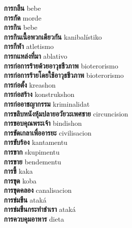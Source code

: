\textbf{ การกลืน  } bebe \\
\textbf{ การกัด  } morde \\
\textbf{ การกิน  } bebe \\
\textbf{ การกินเนื้อพวกเดียวกัน  } kanibalístiko \\
\textbf{ การกีฬา  } atletismo \\
\textbf{ การกแหล่งที่มา  } ablativo \\
\textbf{ การก่อการร้ายด้วยอาวุธชีวภาพ  } bioterorismo \\
\textbf{ การก่อการร้ายโดยใช้อาวุธชีวภาพ  } bioterorismo \\
\textbf{ การก่อตั้ง  } kreashon \\
\textbf{ การก่อสร้าง  } konstrukshon \\
\textbf{ การก่ออาชญากรรม  } kriminalidat \\
\textbf{ การขลิบหนังหุ้มปลายอวัยวะเพศชาย  } circuncision \\
\textbf{ การขอบคุณพระเจ้า  } bindishon \\
\textbf{ การขัดเกลาเพื่ออารยะ  } civilisacion \\
\textbf{ การขับร้อง  } kantamentu \\
\textbf{ การขาก  } skupimentu \\
\textbf{ การขาย  } bendementu \\
\textbf{ การขี้  } kaka \\
\textbf{ การขุด  } koba \\
\textbf{ การขุดคลอง  } canalisacion \\
\textbf{ การข่มขืน  } ataká \\
\textbf{ การข่มขืนกระทำชำเรา  } ataká \\
\textbf{ การควบคุมอาหาร  } dieta \\
